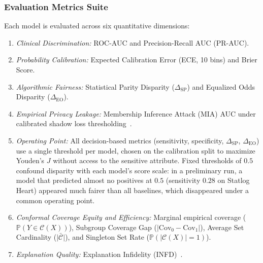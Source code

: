 \documentclass[pdflatex,sn-vancouver-num,referee,lineno]{sn-jnl}
\theoremstyle{thmstyleone}
\theoremstyle{thmstylethree}
\begin{document}
\subsubsection{Evaluation Metrics Suite}
Each model is evaluated across six quantitative dimensions:
\begin{enumerate}
    \item \emph{Clinical Discrimination:} ROC-AUC and Precision-Recall AUC (PR-AUC).
    \item \emph{Probability Calibration:} Expected Calibration Error (ECE, 10 bins) and Brier Score.
    \item \emph{Algorithmic Fairness:} Statistical Parity Disparity ($\Delta_{\text{SP}}$) and Equalized Odds Disparity ($\Delta_{\text{EO}}$).
    \item \emph{Empirical Privacy Leakage:} Membership Inference Attack (MIA) AUC under calibrated shadow loss thresholding~\cite{shokri2017membership,yeom2018privacy,carlini2022membership}.
    \item \emph{Operating Point:} All decision-based metrics (sensitivity, specificity, $\Delta_{\text{SP}}$, $\Delta_{\text{EO}}$) use a single threshold per model, chosen on the calibration split to maximize Youden's $J$ without access to the sensitive attribute. Fixed thresholds of $0.5$ confound disparity with each model's score scale: in a preliminary run, a model that predicted almost no positives at $0.5$ (sensitivity $0.28$ on Statlog Heart) appeared much fairer than all baselines, which disappeared under a common operating point.
    \item \emph{Conformal Coverage Equity and Efficiency:} Marginal empirical coverage ($\mathbb{P}(Y \in \mathcal{C}(X))$), Subgroup Coverage Gap ($|\text{Cov}_0 - \text{Cov}_1|$), Average Set Cardinality ($\bar{|\mathcal{C}|}$), and Singleton Set Rate ($\mathbb{P}(|\mathcal{C}(X)| = 1)$).
    \item \emph{Explanation Quality:} Explanation Infidelity (INFD)~\cite{yeh2019infidelity}.
\end{enumerate}
\end{document}

